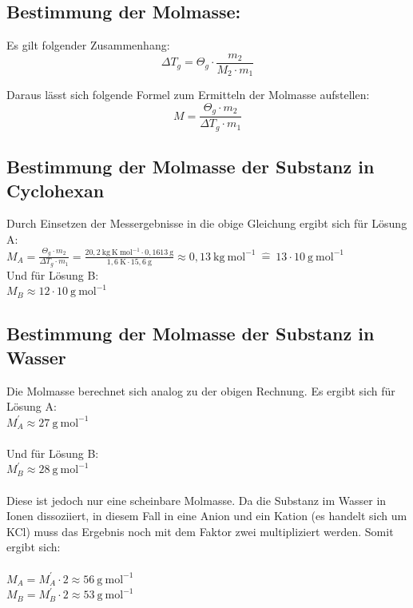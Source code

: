 \documentclass[12pt,a4paper,titlepage,headinclude,bibtotoc]{scrartcl}
\begin{document}
\subsection{Bestimmung der Molmasse:}

Es gilt folgender Zusammenhang:
\begin{equation}
\Delta T_g = \Theta _g \cdot \frac{m_2}{M_2 \cdot m_1}
\end{equation}

Daraus lässt sich folgende Formel zum Ermitteln der Molmasse aufstellen:
\begin{equation}
 M = \frac{\Theta _g \cdot m_2 }{ \Delta T_g\cdot m_1}
\end{equation}

\subsection{ Bestimmung der Molmasse der Substanz in Cyclohexan}

Durch Einsetzen der Messergebnisse in die obige Gleichung ergibt sich für Lösung A:\\

$M_A = \frac {\Theta _g \cdot m_2 }{ \Delta T_g\cdot m_1} 
 = \frac {20,2{~} \mathrm{kg{~}K {~} mol^{-1}} \cdot 0,1613 {~}\text{g}} { 1,6 {~} \mathrm{K} \cdot 15,6{~} \mathrm{g}} \approx 0,13{~} \mathrm{kg {~} mol^{-1}} {~}\widehat{=}{~} 13 \cdot 10{~} \mathrm{g{~}mol^{-1}} $\\

Und für Lösung B:\\

$M_B \approx 12 \cdot 10{~} \mathrm{g{~}mol^{-1}}$


\subsection{Bestimmung der Molmasse der Substanz in Wasser}

Die Molmasse berechnet sich analog zu der obigen Rechnung. Es ergibt sich für Lösung A:\\
$M_A^{'} \approx 27{~} \mathrm{g{~}mol^{-1}}$\\\\
Und für Lösung B:\\
$M_B^{'} \approx 28{~} \mathrm{g{~}mol^{-1}}$\\\\

Diese ist jedoch nur eine scheinbare Molmasse. Da die Substanz im Wasser in Ionen dissoziiert, in diesem Fall in eine Anion und ein Kation (es handelt sich um KCl) muss das Ergebnis noch mit dem Faktor zwei multipliziert werden. Somit ergibt sich:\\\\
$M_A = M_A^{'} \cdot 2 \approx 56{~} \mathrm{g{~}mol^{-1}} $\\
$M_B = M_B^{'} \cdot 2 \approx 53{~} \mathrm{g{~}mol^{-1}} $\\
\end{document}
